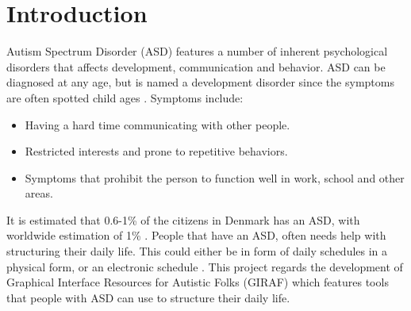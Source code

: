 \chapter{Introduction}

Autism Spectrum Disorder (ASD) features a number of inherent psychological disorders that affects development, communication and behavior. ASD can be diagnosed at any age, but is named a development disorder since the symptoms are often spotted child ages \citep{cite:NIMH}. Symptoms include:

\begin{itemize}
    \item Having a hard time communicating with other people.
    \item Restricted interests and prone to repetitive behaviors.
    \item Symptoms that prohibit the person to function well in work, school and other areas.
\end{itemize} \citep{cite:NIMH}

It is estimated that 0.6-1\% of the citizens in Denmark has an ASD,
with worldwide estimation of 1\% \citep{cite:SundedDK} \citep{cite:AutismSociety}.
People that have an ASD, often needs help with structuring their daily life. This could either be in form of daily schedules in a physical form, or an electronic schedule \citep{cite:NIMH}. 
This project regards the development of Graphical Interface Resources for Autistic Folks (GIRAF) which features tools that people with ASD can use to structure their daily life.